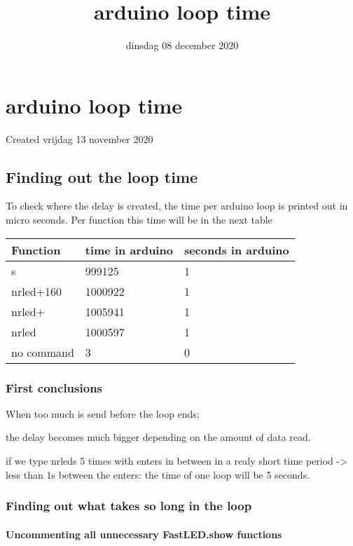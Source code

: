 \documentclass{scrartcl}
\title{arduino loop time}
\date{dinsdag 08 december 2020}
\author{}
\begin{document}
\maketitle

		\section{arduino loop time}

Created vrijdag 13 november 2020



\subsection{Finding out the loop time}

To check where the delay is created, the time per arduino loop is printed out in micro seconds. Per function this time will be in the next table

\begin{tabular}{ |l|l|l| }
\hline
 Function & time in arduino & seconds in arduino \tabularnewline
\hline
\hline
 s & 999125 & 1 \tabularnewline
\hline
 nrled+160 & 1000922 & 1 \tabularnewline
\hline
 nrled+ & 1005941 & 1 \tabularnewline
\hline
 nrled & 1000597 & 1 \tabularnewline
\hline
 no command & 3 & 0 \tabularnewline
\hline
\end{tabular}




\subsubsection{First conclusions}

When too much is send before the loop ends; 

the delay becomes much bigger depending on the amount of data read. 

if we type nrleds 5 times with enters in between in a realy short time period -\textgreater{} less than 1s between the enters: the time of one loop will be 5 seconds.



\subsubsection{Finding out what takes so long in the loop}



\paragraph{Uncommenting all unnecessary FastLED.show functions}
\end{document}
